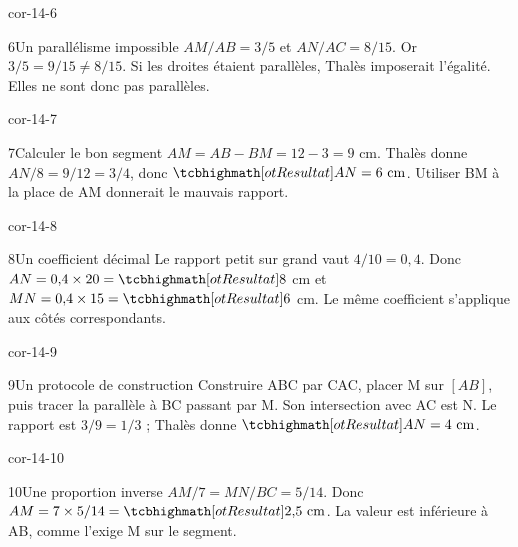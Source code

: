 \begin{blocLivre}{cor-14-6}\begin{corrige}{6}{Un parallélisme impossible}
$AM/AB=3/5$ et $AN/AC=8/15$. Or $3/5=9/15\ne8/15$. Si les droites étaient parallèles, Thalès imposerait l’égalité. Elles ne sont donc pas parallèles.
\label{fig-cor-14-6}
\end{corrige}\end{blocLivre}
\begin{blocLivre}{cor-14-7}\begin{corrige}{7}{Calculer le bon segment}
$AM=AB-BM=12-3=9$ cm. Thalès donne $AN/8=9/12=3/4$, donc $\res{AN=6\ \mathrm{cm}}$. Utiliser BM à la place de AM donnerait le mauvais rapport.
\label{fig-cor-14-7}
\end{corrige}\end{blocLivre}
\begin{blocLivre}{cor-14-8}\begin{corrige}{8}{Un coefficient décimal}
Le rapport petit sur grand vaut $4/10=0{,}4$. Donc $AN=0{,}4\times20=\res8$ cm et $MN=0{,}4\times15=\res6$ cm. Le même coefficient s’applique aux côtés correspondants.
\label{fig-cor-14-8}
\end{corrige}\end{blocLivre}
\begin{blocLivre}{cor-14-9}\begin{corrige}{9}{Un protocole de construction}
Construire ABC par CAC, placer M sur $[AB]$, puis tracer la parallèle à BC passant par M. Son intersection avec AC est N. Le rapport est $3/9=1/3$ ; Thalès donne $\res{AN=4\ \mathrm{cm}}$.
\label{fig-cor-14-9}
\end{corrige}\end{blocLivre}
\begin{blocLivre}{cor-14-10}\begin{corrige}{10}{Une proportion inverse}
$AM/7=MN/BC=5/14$. Donc $AM=7\times5/14=\res{2{,}5\ \mathrm{cm}}$. La valeur est inférieure à AB, comme l’exige M sur le segment.
\label{fig-cor-14-10}
\end{corrige}\end{blocLivre}
